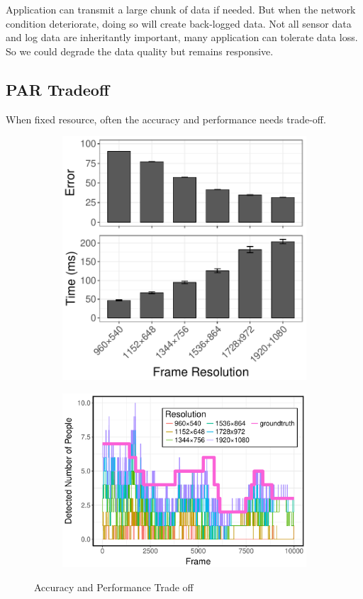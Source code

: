 Application can transmit a large chunk of data if needed. But when the network
condition deteriorate, doing so will create back-logged data. Not all sensor
data and log data are inheritantly important, many application can tolerate data
loss. So we could degrade the data quality but remains responsive.

\subsection{PAR Tradeoff}
\label{sec:par-tradeoff}

When fixed resource, often the accuracy and performance needs trade-off.

\begin{figure}
  \centering
  \begin{subfigure}{.42\columnwidth}
    \centering
    \includegraphics[width=.90\linewidth]{figures/accuracy-performance.pdf}
    \label{fig:a-vs-p}
  \end{subfigure}
  \begin{subfigure}{.54\columnwidth}
    \centering
    \includegraphics[width=.95\linewidth]{figures/time-series.pdf}
    \label{fig:detect-ts}
  \end{subfigure}
  \caption{Accuracy and Performance Trade off}
  \label{fig:bw}
\end{figure}


